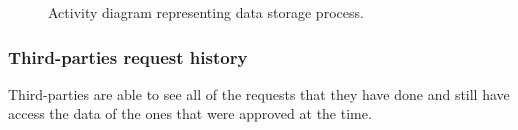            \begin{figure}[H]
                \centering
                \caption{Activity diagram representing data storage process.}
                \label{fig:Data-storage-activity-diagram}
            \end{figure}
            
        \subsubsection{Third-parties request history}
            Third-parties are able to see all of the requests that they have done and still have access the data of the ones that were approved at the time.
            
